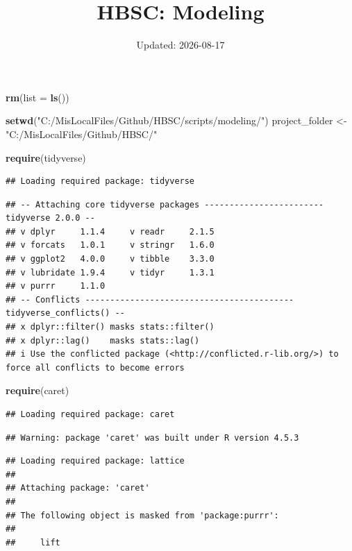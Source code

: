 \documentclass[
]{article}
\title{HBSC: Modeling}
\author{}
\date{\vspace{-2.5em}Updated: 2026-08-17}
\newenvironment{Shaded}{\begin{snugshade}}{\end{snugshade}}
\newcommand{\AttributeTok}[1]{\textcolor[rgb]{0.13,0.29,0.53}{#1}}
\newcommand{\FunctionTok}[1]{\textcolor[rgb]{0.13,0.29,0.53}{\textbf{#1}}}
\newcommand{\NormalTok}[1]{#1}
\newcommand{\OtherTok}[1]{\textcolor[rgb]{0.56,0.35,0.01}{#1}}
\newcommand{\StringTok}[1]{\textcolor[rgb]{0.31,0.60,0.02}{#1}}
\begin{document}
\maketitle

\begin{Shaded}
\begin{Highlighting}[]
\FunctionTok{rm}\NormalTok{(}\AttributeTok{list =} \FunctionTok{ls}\NormalTok{())}

\FunctionTok{setwd}\NormalTok{(}\StringTok{"C:/MisLocalFiles/Github/HBSC/scripts/modeling/"}\NormalTok{)}
\NormalTok{project\_folder }\OtherTok{\textless{}{-}} \StringTok{"C:/MisLocalFiles/Github/HBSC/"}

\FunctionTok{require}\NormalTok{(tidyverse)}
\end{Highlighting}
\end{Shaded}

\begin{verbatim}
## Loading required package: tidyverse
\end{verbatim}

\begin{verbatim}
## -- Attaching core tidyverse packages ------------------------ tidyverse 2.0.0 --
## v dplyr     1.1.4     v readr     2.1.5
## v forcats   1.0.1     v stringr   1.6.0
## v ggplot2   4.0.0     v tibble    3.3.0
## v lubridate 1.9.4     v tidyr     1.3.1
## v purrr     1.1.0     
## -- Conflicts ------------------------------------------ tidyverse_conflicts() --
## x dplyr::filter() masks stats::filter()
## x dplyr::lag()    masks stats::lag()
## i Use the conflicted package (<http://conflicted.r-lib.org/>) to force all conflicts to become errors
\end{verbatim}

\begin{Shaded}
\begin{Highlighting}[]
\FunctionTok{require}\NormalTok{(caret)}
\end{Highlighting}
\end{Shaded}

\begin{verbatim}
## Loading required package: caret
\end{verbatim}

\begin{verbatim}
## Warning: package 'caret' was built under R version 4.5.3
\end{verbatim}

\begin{verbatim}
## Loading required package: lattice
## 
## Attaching package: 'caret'
## 
## The following object is masked from 'package:purrr':
## 
##     lift
\end{verbatim}
\end{document}
